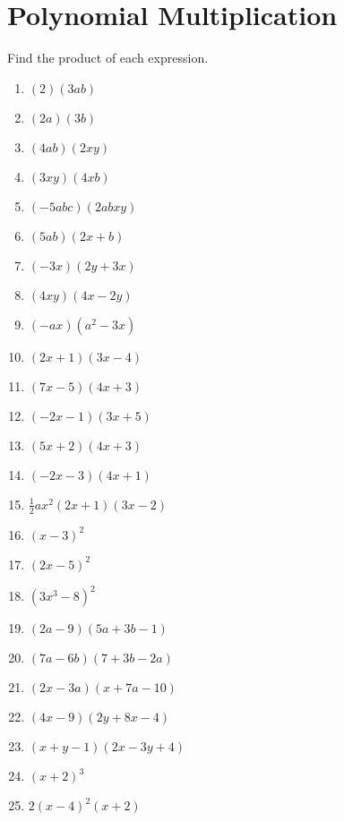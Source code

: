 \section{Polynomial Multiplication}
Find the product of each expression.
\begin{enumerate}
\item $(2)(3ab)$
\item $(2a)(3b)$
\item $(4ab)(2xy)$
\item $(3xy)(4xb)$
\item $(-5abc)(2abxy)$
\item $(5ab)(2x+b)$
\item $(-3x)(2y+3x)$
\item $(4xy)(4x-2y)$
\item $(-ax)(a^{2}-3x)$
\item $(2x+1)(3x-4)$
\item $(7x-5)(4x+3)$
\item $(-2x-1)(3x+5)$
\item $(5x+2)(4x+3)$
\item $(-2x-3)(4x+1)$
\item $\frac{1}{2}ax^{2}(2x+1)(3x-2)$
\item $(x-3)^{2}$
\item $(2x-5)^{2}$
\item $(3x^{3}-8)^{2}$
\item $(2a-9)(5a+3b-1)$
\item $(7a-6b)(7+3b-2a)$
\item $(2x-3a)(x+7a-10)$
\item $(4x-9)(2y+8x-4)$
\item $(x+y-1)(2x-3y+4)$
\item $(x+2)^{3}$
\item $2(x-4)^{2}(x+2)$
\end{enumerate}
